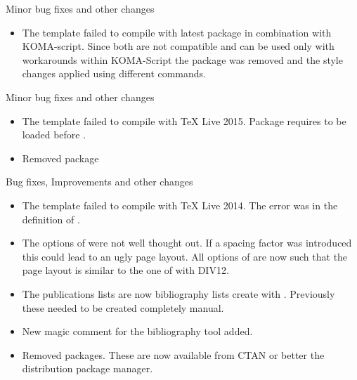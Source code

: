 Minor bug fixes and other changes
\begin{itemize}
\item The template failed to compile with latest package  in combination with KOMA-script. Since both are not compatible and can be used only with workarounds within KOMA-Script the package  was removed and the style changes applied using different commands.
\end{itemize}


Minor bug fixes and other changes
\begin{itemize}
\item The template failed to compile with TeX Live 2015. Package  requires  to be loaded before . 
\item Removed package 
\end{itemize}


Bug fixes, Improvements and other changes
\begin{itemize}
\item The template failed to compile with TeX Live 2014. The error was in the definition of . 
\item The options of  were not well thought out. If a spacing factor was introduced this could lead to an ugly page layout. All options of  are now such that the page layout is similar to the one of  with DIV12. 
\item The publications lists are now bibliography lists create with . Previously these needed to be created completely manual.
\item New magic comment for the bibliography tool added.
\item Removed packages. These are now available from CTAN or better the distribution package manager. 
\end{itemize}

